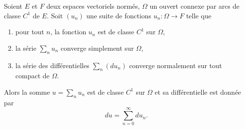 \begin{theorem} \label{ThoLDpRmXQ}
	Soient \( E\) et \( F\) deux espaces vectoriels normés, \( \Omega\) un ouvert connexe par arcs de classe \( C^1\) de \( E\). Soit \( (u_n)\) une suite de fonctions \( u_n\colon \Omega\to F\) telle que
	\begin{enumerate}
		\item
		      pour tout \( n\), la fonction \( u_n\) est de classe \( C^1\) sur \( \Omega\),
		\item
		      la série \( \sum_nu_n\) converge simplement sur \( \Omega\),
		\item
		      la série des différentielles \( \sum_n(du_n)\) converge normalement sur tout compact de \( \Omega\).
	\end{enumerate}
	Alors la somme \( u=\sum_nu_n\) est de classe \( C^1\) sur \( \Omega\) et sa différentielle est donnée par
	\begin{equation}
		du=\sum_{n=0}^{\infty}du_n.
	\end{equation}
\end{theorem}

